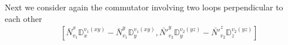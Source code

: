 \documentclass[12pt]{article}
\newcommand{\nn}{\nonumber}
\def\cl{{\cal L}}
\begin{document}
\begin{appendix}
Next we consider again the commutator involving two loops perpendicular to each other
\begin{eqnarray}
&&\left[
\bar{N}_{v_1}^x \mathds{D}_x^{v_1(xy)} -  \bar{N}_{v_1}^y \mathds{D}_y^{v_1(xy)} , \bar{N'}_{v_2}^{y} \mathds{D}_y^{v_2(yz)} -  \bar{N'}_{v_2}^z \mathds{D}_z^{v_2(yz)} 
 \right]  \nn\\

\end{eqnarray}
\end{appendix}
\end{document}
